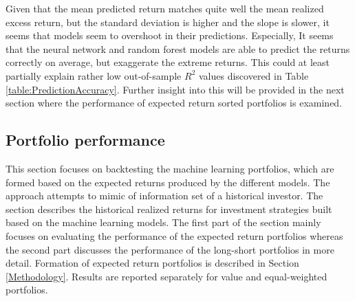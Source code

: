 \documentclass[12pt]{article}
\begin{document}
Given that the mean predicted return matches quite well the mean realized excess return, but the standard deviation is higher and the slope is slower, it seems that models seem to overshoot in their predictions. Especially, It seems that the neural network and random forest models are able to predict the returns correctly on average, but exaggerate the extreme returns. This could at least partially explain rather low out-of-sample $R^2$ values discovered in Table \ref{table:PredictionAccuracy}. Further insight into this will be provided in the next section where the performance of expected return sorted portfolios is examined. \par

\subsection{Portfolio performance}\label{PortfolioPerformance}

This section focuses on backtesting the machine learning portfolios, which are formed based on the expected returns produced by the different models. The approach attempts to mimic of information set of a historical investor. The section describes the historical realized returns for investment strategies built based on the machine learning models. The first part of the section mainly focuses on evaluating the performance of the expected return portfolios whereas the second part discusses the performance of the long-short portfolios in more detail. Formation of expected return portfolios is described in Section \ref{Methodology}. Results are reported separately for value and equal-weighted portfolios. \par
\end{document}
